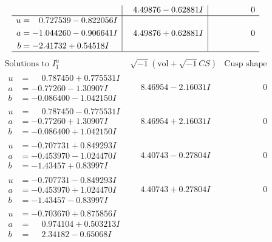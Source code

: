\documentclass[1p]{elsarticle_modified}
\theoremstyle{definition}
\newcommand{\I}{\sqrt{-1}}
\begin{document}
$$\begin{array}{c|c|c}
 & \phantom{-}4.49876 - 0.62881 I & \phantom{-0.000000 } 0 \\ \hline\begin{aligned}
u &= \phantom{-}0.727539 - 0.822056 I \\
a &= -1.044260 - 0.906641 I \\
b &= -2.41732 + 0.54518 I\end{aligned}
 & \phantom{-}4.49876 + 0.62881 I & \phantom{-0.000000 } 0\\
 \hline 
 \end{array}$$\newpage$$\begin{array}{c|c|c}  
\text{Solutions to }I^u_{1}& \I (\text{vol} + \sqrt{-1}CS) & \text{Cusp shape}\\
 \hline 
\begin{aligned}
u &= \phantom{-}0.787450 + 0.775531 I \\
a &= -0.77260 - 1.30907 I \\
b &= -0.086400 - 1.042150 I\end{aligned}
 & \phantom{-}8.46954 - 2.16031 I & \phantom{-0.000000 } 0 \\ \hline\begin{aligned}
u &= \phantom{-}0.787450 - 0.775531 I \\
a &= -0.77260 + 1.30907 I \\
b &= -0.086400 + 1.042150 I\end{aligned}
 & \phantom{-}8.46954 + 2.16031 I & \phantom{-0.000000 } 0 \\ \hline\begin{aligned}
u &= -0.707731 + 0.849293 I \\
a &= -0.453970 - 1.024470 I \\
b &= -1.43457 + 0.83997 I\end{aligned}
 & \phantom{-}4.40743 - 0.27804 I & \phantom{-0.000000 } 0 \\ \hline\begin{aligned}
u &= -0.707731 - 0.849293 I \\
a &= -0.453970 + 1.024470 I \\
b &= -1.43457 - 0.83997 I\end{aligned}
 & \phantom{-}4.40743 + 0.27804 I & \phantom{-0.000000 } 0 \\ \hline\begin{aligned}
u &= -0.703670 + 0.875856 I \\
a &= \phantom{-}0.974104 + 0.503213 I \\
b &= \phantom{-}2.34182 - 0.65068 I\end{aligned}

\end{array}$$
\end{document}

